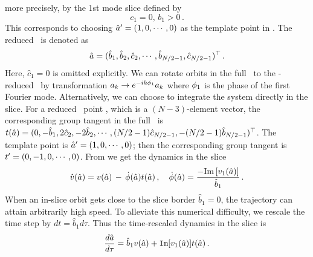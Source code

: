 more precisely, by the 1st mode slice
defined by
\begin{equation}
  \label{eq:ksslice}
  c_1 = 0 ,\, b_1 >0
  \,.
\end{equation}
This corresponds to choosing
${\hat{a}'} = (1, 0,\cdots, 0)$ as the template point
in .
The reduced \statesp\ is denoted as
\begin{equation}
  \label{eq:KSspred}
  \hat{a}=(\hat{b}_{1}, \hat{b}_{2}, \hat{c}_{2},\cdots, \hat{b}_{N/2-1}, \hat{c}_{N/2-1})^\top
  \,.
\end{equation}
Here, $\hat{c}_{1} = 0$ is omitted explicitly.
We can rotate orbits in the full \statesp\ to
the -reduced \statesp\ by transformation
$a_k \to e^{-ik{\bf \phi}_1}a_k$ where ${\bf \phi}_1$ is the phase of the first Fourier mode.
Alternatively, we can choose to integrate the system directly in the slice.
For a reduced \statesp\ point , which is
a $(N-3)$-element vector, the corresponding group tangent in the full
\statesp\ is
$t(\hat{a}) = (0, -\hat{b}_{1}, 2\hat{c}_{2}, -2\hat{b}_{2}, \cdots,
(N/2-1)\hat{c}_{N/2-1}, -(N/2-1)\hat{b}_{N/2-1})^\top$.
The template point is ${\hat{a}'}=(1,0,\cdots,0)$;
then the corresponding group tangent is $t'_{} = (0, -1, 0, \cdots, 0)$.
From 
we get the dynamics in the slice
\[
  \hat{v}(\hat{a}) = v(\hat{a})
  \,-\, \dot{{\bf \phi}}(\hat{a}) t(\hat{a})
  \,,\quad
  \dot{{\bf \phi}}(\hat{a}) = \frac{-\mathrm{Im}\,[v_1(\hat{a})] }{ \hat{b}_{1} }
  \,.
\]
When an in-slice orbit gets close to the slice border $\hat{b}_1 = 0$,
the trajectory can attain arbitrarily high speed.
To alleviate this numerical difficulty,
we rescale the time step by $dt=\hat{b}_1 d\tau$.
Thus the time-rescaled dynamics in the slice is
\begin{equation}
  \label{eq:ksRescale}
  \frac{d \hat{a}}{d\tau} = \hat{b}_1 v(\hat{a}) + \mathtt{Im}[v_1(\hat{a})] t(\hat{a})
  \,.
\end{equation}
